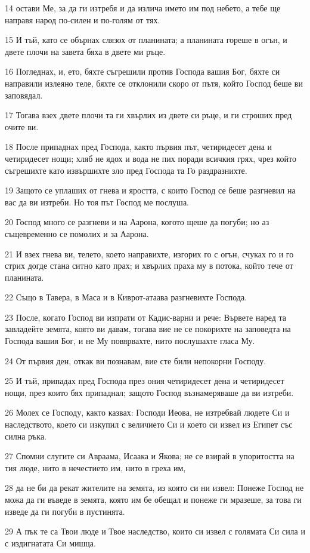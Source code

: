 \par 14 остави Ме, за да ги изтребя и да излича името им под небето, а тебе ще направя народ по-силен и по-голям от тях.
\par 15 И тъй, като се обърнах слязох от планината; а планината гореше в огън, и двете плочи на завета бяха в двете ми ръце.
\par 16 Погледнах, и, ето, бяхте съгрешили против Господа вашия Бог, бяхте си направили излеяно теле, бяхте се отклонили скоро от пътя, който Господ беше ви заповядал.
\par 17 Тогава взех двете плочи та ги хвърлих из двете си ръце, и ги строших пред очите ви.
\par 18 После припаднах пред Господа, както първия път, четиридесет дена и четиридесет нощи; хляб не ядох и вода не пих поради всичкия грях, чрез който съгрешихте като извършихте зло пред Господа та Го раздразнихте.
\par 19 Защото се уплаших от гнева и яростта, с които Господ се беше разгневил на вас да ви изтреби. Но тоя път Господ ме послуша.
\par 20 Господ много се разгневи и на Аарона, когото щеше да погуби; но аз същевременно се помолих и за Аарона.
\par 21 И взех гнева ви, телето, което направихте, изгорих го с огън, счуках го и го стрих догде стана ситно като прах; и хвърлих праха му в потока, който тече от планината.
\par 22 Също в Тавера, в Маса и в Киврот-атаава разгневихте Господа.
\par 23 После, когато Господ ви изпрати от Кадис-варни и рече: Вървете наред та завладейте земята, която ви давам, тогава вие не се покорихте на заповедта на Господа вашия Бог, и не Му повярвахте, нито послушахте гласа Му.
\par 24 От първия ден, откак ви познавам, вие сте били непокорни Господу.
\par 25 И тъй, припадах пред Господа през ония четиридесет дена и четиридесет нощи, през които бях припаднал; защото Господ възнамеряваше да ви изтреби.
\par 26 Молех се Господу, както казвах: Господи Иеова, не изтребвай людете Си и наследството, което си изкупил с величието Си и което си извел из Египет със силна ръка.
\par 27 Спомни слугите си Авраама, Исаака и Якова; не се взирай в упоритостта на тия люде, нито в нечестието им, нито в греха им,
\par 28 да не би да рекат жителите на земята, из която си ни извел: Понеже Господ не можа да ги въведе в земята, която им бе обещал и понеже ги мразеше, за това ги изведе да ги погуби в пустинята.
\par 29 А пък те са Твои люде и Твое наследство, които си извел с голямата Си сила и с издигнатата Си мишца.

